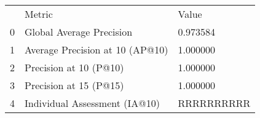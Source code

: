 \begin{tabular}{lll}
 & Metric & Value \\
0 & Global Average Precision & 0.973584 \\
1 & Average Precision at 10 (AP@10) & 1.000000 \\
2 & Precision at 10 (P@10) & 1.000000 \\
3 & Precision at 15 (P@15) & 1.000000 \\
4 & Individual Assessment (IA@10) & RRRRRRRRRR \\
\end{tabular}
